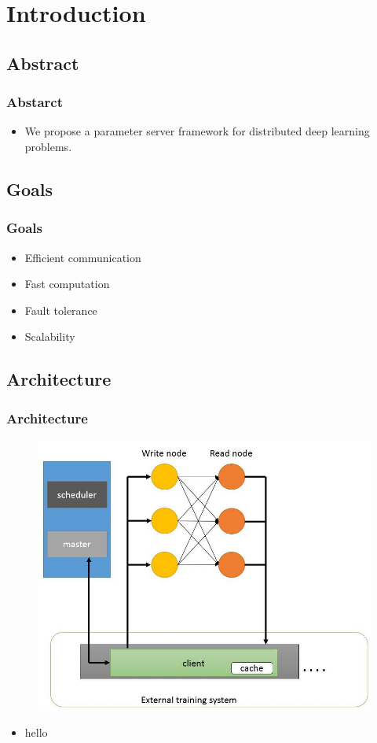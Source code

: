 \section{Introduction}

\subsection{Abstract}
\begin{frame}
    \frametitle{Abstarct}
	\begin{itemize}
		\item We propose a parameter server framework for distributed deep learning problems.
	\end{itemize}
\end{frame}

\subsection{Goals}
\begin{frame}
    \frametitle{Goals}
	\begin{itemize}
		\item Efficient communication
		\item Fast computation
		\item Fault tolerance
		\item Scalability
	\end{itemize}
\end{frame}

\subsection{Architecture}
\begin{frame}
    \frametitle{Architecture}
    \begin{figure}
		\includegraphics[scale=0.3]{figure/arch.jpg}
	\end{figure}
	\begin{itemize}
		\item hello
	\end{itemize}
\end{frame}


